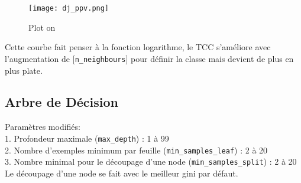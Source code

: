 \documentclass[10pt,letterpaper]{article}
\begin{document}
\begin{figure}[H]
\centering
\texttt{[image: dj\_ppv.png]}
\caption{Plot on \protect{}}
\end{figure}

Cette courbe fait penser à la fonction logarithme, le TCC s’améliore avec l’augmentation de [\verb!n_neighbours!] pour définir la classe mais devient de plus en plus plate.

\subsection*{Arbre de Décision}
Paramètres modifiés:\\
1. Profondeur maximale (\verb!max_depth!) : 1 à 99\\
2. Nombre d’exemples minimum par feuille (\verb!min_samples_leaf!) : 2 à 20\\
3. Nombre minimal pour le découpage d’une node (\verb!min_samples_split!) : 2 à 20\\

\vspace{2mm}
Le découpage d’une node se fait avec le meilleur gini par défaut.
\end{document}

